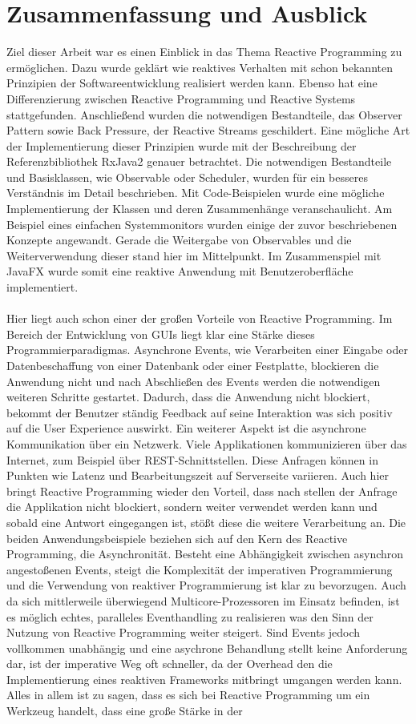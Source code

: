 \chapter{Zusammenfassung und Ausblick}\label{eval}
Ziel dieser Arbeit war es einen Einblick in das Thema Reactive Programming zu ermöglichen. Dazu wurde geklärt wie reaktives Verhalten mit schon bekannten Prinzipien der Softwareentwicklung realisiert werden kann. Ebenso hat eine Differenzierung zwischen Reactive Programming und Reactive Systems stattgefunden. Anschließend wurden die notwendigen Bestandteile, das Observer Pattern sowie Back Pressure, der Reactive Streams geschildert. Eine mögliche Art der Implementierung dieser Prinzipien wurde mit der Beschreibung der Referenzbibliothek RxJava2 genauer betrachtet. Die notwendigen Bestandteile und Basisklassen, wie Observable oder Scheduler, wurden für ein besseres Verständnis im Detail beschrieben. Mit Code-Beispielen wurde eine mögliche Implementierung der Klassen und deren Zusammenhänge veranschaulicht. Am Beispiel eines einfachen Systemmonitors wurden einige der zuvor beschriebenen Konzepte angewandt. Gerade die Weitergabe von Observables und die Weiterverwendung dieser stand hier im Mittelpunkt. Im Zusammenspiel mit JavaFX wurde somit eine reaktive Anwendung mit Benutzeroberfläche implementiert. \\ \\ Hier liegt auch schon einer der großen Vorteile von Reactive Programming. Im Bereich der Entwicklung von GUIs liegt klar eine Stärke dieses Programmierparadigmas. Asynchrone Events, wie Verarbeiten einer Eingabe oder Datenbeschaffung von einer Datenbank oder einer Festplatte, blockieren die Anwendung nicht und nach Abschließen des Events werden die notwendigen weiteren Schritte gestartet. Dadurch, dass die Anwendung nicht blockiert, bekommt der Benutzer ständig Feedback auf seine Interaktion was sich positiv auf die User Experience auswirkt. Ein weiterer Aspekt ist die asynchrone Kommunikation über ein Netzwerk. Viele Applikationen kommunizieren über das Internet, zum Beispiel über REST-Schnittstellen. Diese Anfragen können in Punkten wie Latenz und Bearbeitungszeit auf Serverseite variieren. Auch hier bringt Reactive Programming wieder den Vorteil, dass nach stellen der Anfrage die Applikation nicht blockiert, sondern weiter verwendet werden kann und sobald eine Antwort eingegangen ist, stößt diese die weitere Verarbeitung an. Die beiden Anwendungsbeispiele beziehen sich auf den Kern des Reactive Programming, die Asynchronität. Besteht eine Abhängigkeit zwischen asynchron angestoßenen Events, steigt die Komplexität der imperativen Programmierung und die Verwendung von reaktiver Programmierung ist klar zu bevorzugen. Auch da sich mittlerweile überwiegend Multicore-Prozessoren im Einsatz befinden, ist es möglich echtes, paralleles Eventhandling zu realisieren was den Sinn der Nutzung von Reactive Programming weiter steigert. Sind Events jedoch vollkommen unabhängig und eine asychrone Behandlung stellt keine Anforderung dar, ist der imperative Weg oft schneller, da der Overhead den die Implementierung eines reaktiven Frameworks mitbringt umgangen werden kann. Alles in allem ist zu sagen, dass es sich bei Reactive Programming um ein Werkzeug handelt, dass eine große Stärke in der 